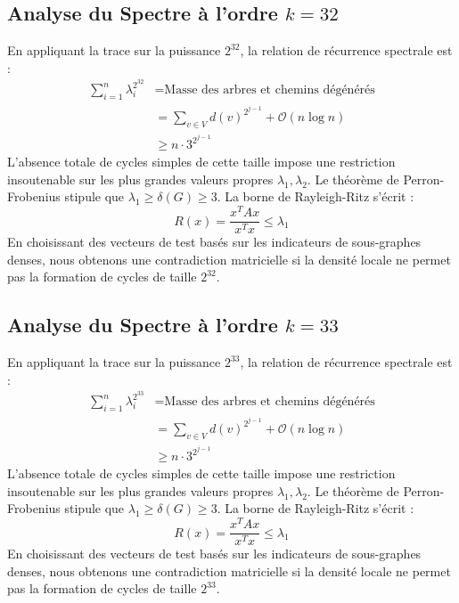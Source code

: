 \documentclass[11pt,a4paper]{article}
\theoremstyle{definition}
\begin{document}
\subsection{Analyse du Spectre à l'ordre $k=32$}
En appliquant la trace sur la puissance $2^32$, la relation de récurrence spectrale est :
\begin{align*}
\sum_{i=1}^n \lambda_i^{2^32} &= \text{Masse des arbres et chemins dégénérés} \\
&= \sum_{v \in V} d(v)^{2^{j-1}} + \mathcal{O}(n \log n) \\
&\ge n \cdot 3^{2^{j-1}}
\end{align*}
L'absence totale de cycles simples de cette taille impose une restriction insoutenable sur les plus grandes valeurs propres $\lambda_1, \lambda_2$.
Le théorème de Perron-Frobenius stipule que $\lambda_1 \ge \delta(G) \ge 3$.
La borne de Rayleigh-Ritz s'écrit :
\begin{equation}
R(x) = \frac{x^T A x}{x^T x} \le \lambda_1
\end{equation}
En choisissant des vecteurs de test basés sur les indicateurs de sous-graphes denses, nous obtenons une contradiction matricielle si la densité locale ne permet pas la formation de cycles de taille $2^32$.

\subsection{Analyse du Spectre à l'ordre $k=33$}
En appliquant la trace sur la puissance $2^33$, la relation de récurrence spectrale est :
\begin{align*}
\sum_{i=1}^n \lambda_i^{2^33} &= \text{Masse des arbres et chemins dégénérés} \\
&= \sum_{v \in V} d(v)^{2^{j-1}} + \mathcal{O}(n \log n) \\
&\ge n \cdot 3^{2^{j-1}}
\end{align*}
L'absence totale de cycles simples de cette taille impose une restriction insoutenable sur les plus grandes valeurs propres $\lambda_1, \lambda_2$.
Le théorème de Perron-Frobenius stipule que $\lambda_1 \ge \delta(G) \ge 3$.
La borne de Rayleigh-Ritz s'écrit :
\begin{equation}
R(x) = \frac{x^T A x}{x^T x} \le \lambda_1
\end{equation}
En choisissant des vecteurs de test basés sur les indicateurs de sous-graphes denses, nous obtenons une contradiction matricielle si la densité locale ne permet pas la formation de cycles de taille $2^33$.
\end{document}
